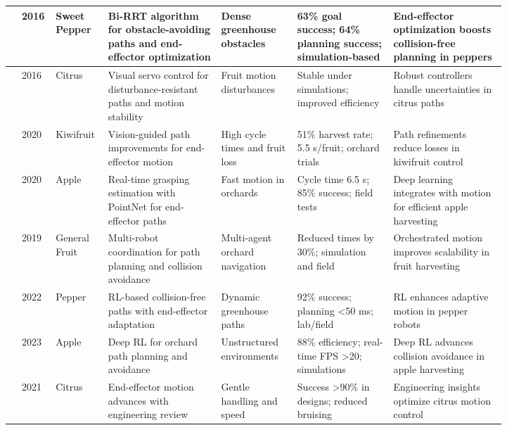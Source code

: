 \documentclass[a4paper,fleqn]{cas-dc}
\begin{document}
\begin{table}[htbp]
\begin{tabular}{p{0.025\linewidth} p{0.025\linewidth} p{0.055\linewidth} p{0.2\linewidth} p{0.135\linewidth} p{0.175\linewidth} p{0.2\linewidth}}
\cite{bac2016analysis} & 2016 & Sweet Pepper & Bi-RRT algorithm for obstacle-avoiding paths and end-effector optimization & Dense greenhouse obstacles & 63\% goal success; 64\% planning success; simulation-based & End-effector optimization boosts collision-free planning in peppers \\ \midrule
\cite{mehta2016robust} & 2016 & Citrus & Visual servo control for disturbance-resistant paths and motion stability & Fruit motion disturbances & Stable under simulations; improved efficiency & Robust controllers handle uncertainties in citrus paths \\ \midrule
\cite{williams2020improvements} & 2020 & Kiwifruit & Vision-guided path improvements for end-effector motion & High cycle times and fruit loss & 51\% harvest rate; 5.5 s/fruit; orchard trials & Path refinements reduce losses in kiwifruit control \\ \midrule
\cite{kang2020real} & 2020 & Apple & Real-time grasping estimation with PointNet for end-effector paths  & Fast motion in orchards & Cycle time 6.5 s; 85\% success; field tests & Deep learning integrates with motion for efficient apple harvesting \\ \midrule
\cite{vougioukas2019orchestra} & 2019 & General Fruit & Multi-robot coordination for path planning and collision avoidance  & Multi-agent orchard navigation & Reduced times by 30\%; simulation and field & Orchestrated motion improves scalability in fruit harvesting \\ \midrule
\cite{verbiest2022path} & 2022 & Pepper & RL-based collision-free paths with end-effector adaptation  & Dynamic greenhouse paths & 92\% success; planning <50 ms; lab/field & RL enhances adaptive motion in pepper robots \\ \midrule
\cite{zhang2023deep} & 2023 & Apple & Deep RL for orchard path planning and avoidance & Unstructured environments & 88\% efficiency; real-time FPS >20; simulations & Deep RL advances collision avoidance in apple harvesting \\ \midrule
\cite{burks2021engineering} & 2021 & Citrus & End-effector motion advances with engineering review  & Gentle handling and speed & Success >90\% in designs; reduced bruising & Engineering insights optimize citrus motion control \\ 
\bottomrule
\end{tabular}
\end{table}
\end{document}
